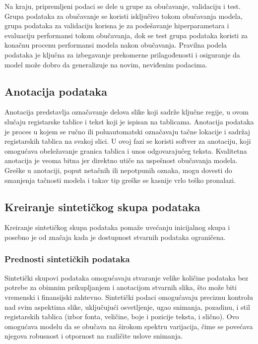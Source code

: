 \documentclass[a4paper,12pt]{article}
\begin{document}
	Na kraju, pripremljeni podaci se dele u grupe za obučavanje, validaciju i test. Grupa podataka za obučavanje se koristi isključivo tokom obučavanja modela, grupa podataka za validaciju korisna je za podešavanje hiperparametara i evaluaciju performansi tokom obučavanja, dok se test grupa podataka koristi za konačnu procenu performansi modela nakon obučavanja. Pravilna podela podataka je ključna za izbegavanje prekomerne prilagođenosti i osiguranje da model može dobro da generalizuje na novim, neviđenim podacima.
	
	\subsection{Anotacija podataka}
	Anotacija predstavlja označavanje delova slike koji sadrže ključne regije, u ovom slučaju registarske tablice i tekst koji je ispisan na tablicama. Anotacija podataka je proces u kojem se ručno ili poluautomatski označavaju tačne lokacije i sadržaj registarskih tablica na svakoj slici. U ovoj fazi se koristi softver za anotaciju, koji omogućava obeležavanje granica tablica i unos odgovarajućeg teksta. Kvalitetna anotacija je veoma bitna jer direktno utiče na uspešnost obučavanja modela. Greške u anotaciji, poput netačnih ili nepotpunih oznaka, mogu dovesti do smanjenja tačnosti modela i takav tip greške se kasnije vrlo teško pronalazi.
	
	\subsection{Kreiranje sintetičkog skupa podataka}
	Kreiranje sintetičkog skupa podataka pomaže uvećanju inicijalnog skupa i posebno je od značaja kada je dostupnost stvarnih podataka ograničena.
	
	\subsubsection{Prednosti sintetičkih podataka}
	Sintetički skupovi podataka omogućavaju stvaranje velike količine podataka bez potrebe za obimnim prikupljanjem i anotacijom stvarnih slika, što može biti vremenski i finansijski zahtevno. Sintetički podaci omogućavaju preciznu kontrolu nad svim aspektima slike, uključujući osvetljenje, ugao snimanja, pozadinu, i stil registarskih tablica (izbor fonta, veličine, boje i pozicije teksta, i slično). Ovo omogućava modelu da se obučava na širokom spektru varijacija, čime se povećava njegova robusnost i otpornost na različite uslove snimanja.
	
\end{document}
